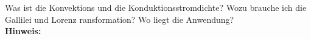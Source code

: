 \begin{question}[section=2,subsection=22,name={Stromdichte},difficulty=4,type=mdl,tags={}]
	Was ist die Konvektions und die Konduktionsstromdichte? Wozu brauche ich die Gallilei und Lorenz ransformation? Wo liegt die Anwendung?
	\\ \textbf{Hinweis:}\\
	
\end{question}
\begin{solution}
	
\end{solution}